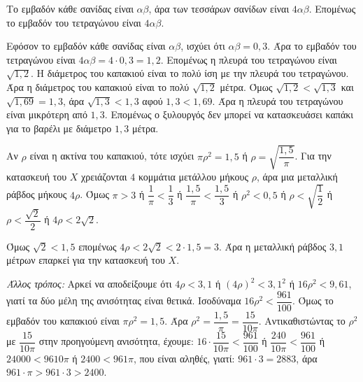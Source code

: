 
\begin{alist}
\item Το εμβαδόν κάθε σανίδας είναι $\alpha\beta$, άρα των τεσσάρων σανίδων είναι $4\alpha\beta$. Επομένως το εμβαδόν του τετραγώνου είναι $4\alpha\beta$.

\item Εφόσον το εμβαδόν κάθε σανίδας είναι $\alpha\beta$, ισχύει ότι $\alpha\beta = 0,3$. Άρα το εμβαδόν του τετραγώνου είναι $4\alpha\beta = 4 \cdot 0,3 = 1,2$.
Επομένως η πλευρά του τετραγώνου είναι $\sqrt{1,2}$.
Η διάμετρος του καπακιού είναι το πολύ ίση με την πλευρά του τετραγώνου. Άρα η διάμετρος του καπακιού είναι το πολύ $\sqrt{1,2}$ μέτρα. Όμως $\sqrt{1,2} < \sqrt{1,3}$ και $\sqrt{1,69} = 1,3$, άρα $\sqrt{1,3} < 1,3$ αφού $1,3 < 1,69$. Άρα η πλευρά του τετραγώνου είναι μικρότερη από $1,3$.
Επομένως ο ξυλουργός δεν μπορεί να κατασκευάσει καπάκι για το βαρέλι με διάμετρο $1,3$ μέτρα.

\item Αν $\rho$ είναι η ακτίνα του καπακιού, τότε ισχύει $\pi\rho^2 = 1,5$ ή $\rho = \sqrt{\dfrac{1,5}{\pi}}$.
Για την κατασκευή του $X$ χρειάζονται $4$ κομμάτια μετάλλου μήκους $\rho$, άρα μια μεταλλική ράβδος μήκους $4\rho$.
Όμως $\pi > 3$ ή $\dfrac{1}{\pi} < \dfrac{1}{3}$ ή $\dfrac{1,5}{\pi} < \dfrac{1,5}{3}$ ή $\rho^2 < 0,5$ ή $\rho < \sqrt{\dfrac{1}{2}}$ ή $\rho < \dfrac{\sqrt{2}}{2}$ ή $4\rho < 2\sqrt{2}$.

Όμως $\sqrt{2} < 1,5$ επομένως $4\rho < 2\sqrt{2} < 2 \cdot 1,5 = 3$.
Άρα η μεταλλική ράβδος $3,1$ μέτρων επαρκεί για την κατασκευή του $X$.

\textit{Άλλος τρόπος:}
Αρκεί να αποδείξουμε ότι $4\rho < 3,1$ ή $(4\rho)^2 < 3,1^2$ ή $16\rho^2 < 9,61$, γιατί τα δύο μέλη της ανισότητας είναι θετικά.
Ισοδύναμα $16\rho^2 < \dfrac{961}{100}$.
Όμως το εμβαδόν του καπακιού είναι $\pi\rho^2 = 1,5$. Άρα $\rho^2 = \dfrac{1,5}{\pi} = \dfrac{15}{10\pi}$.
Αντικαθιστώντας το $\rho^2$ με $\dfrac{15}{10\pi}$ στην προηγούμενη ανισότητα, έχουμε:
$16 \cdot \dfrac{15}{10\pi} < \dfrac{961}{100}$ ή $\dfrac{240}{10\pi} < \dfrac{961}{100}$ ή $24000 < 9610\pi$ ή $2400 < 961\pi$, που είναι αληθές, γιατί:
$961 \cdot 3 = 2883$, άρα $961 \cdot \pi > 961 \cdot 3 > 2400$.
\end{alist}


